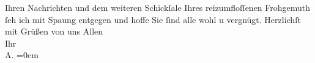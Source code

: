 \begin{ledgroupsized}[t]{13cm}
           \pstart
           Ihren Nachrichten und dem weiteren Schickſale Ihres reizumfloſſenen Frohgemuth ſeh ich mit Spa{\geminationn}ung entgegen und hoffe Sie ſind alle wohl u vergnügt.
               Herzlichſt mit Grüßen von uns Allen {\\[\baselineskip]}Ihr {\\[\baselineskip]}\spacefill\mbox{A.}\pend
           \leftskip=0em{}
         
         \endnumbering{}\end{ledgroupsized}  \newcommand{\dateiname}{L03018}\newcommand{\titel}{Arthur Schnitzler an Felix Salten, 8. 8. [1910]}\newcommand{\editorInnen}{Martin Anton Müller und Laura Untner}
      